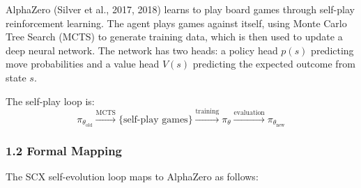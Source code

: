 \documentclass[
  12pt,
]{ctexart}
\begin{document}
AlphaZero (Silver et al., 2017, 2018) learns to play board games through
self-play reinforcement learning. The agent plays games against itself,
using Monte Carlo Tree Search (MCTS) to generate training data, which is
then used to update a deep neural network. The network has two heads: a
policy head \(p(s)\) predicting move probabilities and a value head
\(V(s)\) predicting the expected outcome from state \(s\).

The self-play loop is:
\[\pi_{\theta_{\text{old}}} \xrightarrow{\text{MCTS}} \{\text{self-play games}\} \xrightarrow{\text{training}} \pi_\theta \xrightarrow{\text{evaluation}} \pi_{\theta_{\text{new}}}\]

\subsubsection{1.2 Formal Mapping}\label{formal-mapping}

The SCX self-evolution loop maps to AlphaZero as follows:
\end{document}
